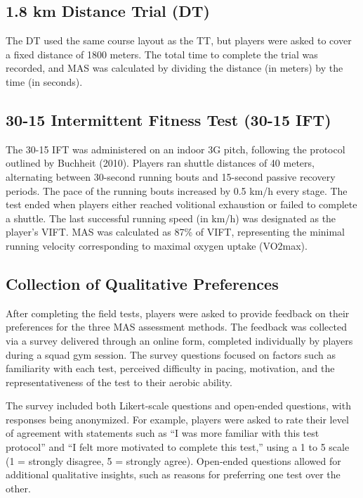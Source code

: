 \documentclass[
  man]{apa6}
\begin{document}
\subsection{1.8 km Distance Trial (DT)}\label{km-distance-trial-dt}

The DT used the same course layout as the TT, but players were asked to cover a fixed distance of 1800 meters. The total time to complete the trial was recorded, and MAS was calculated by dividing the distance (in meters) by the time (in seconds).

\subsection{30-15 Intermittent Fitness Test (30-15 IFT)}\label{intermittent-fitness-test-30-15-ift}

The 30-15 IFT was administered on an indoor 3G pitch, following the protocol outlined by Buchheit (2010). Players ran shuttle distances of 40 meters, alternating between 30-second running bouts and 15-second passive recovery periods. The pace of the running bouts increased by 0.5 km/h every stage. The test ended when players either reached volitional exhaustion or failed to complete a shuttle. The last successful running speed (in km/h) was designated as the player's VIFT. MAS was calculated as 87\% of VIFT, representing the minimal running velocity corresponding to maximal oxygen uptake (VO2max).

\subsection{Collection of Qualitative Preferences}\label{collection-of-qualitative-preferences}

After completing the field tests, players were asked to provide feedback on their preferences for the three MAS assessment methods. The feedback was collected via a survey delivered through an online form, completed individually by players during a squad gym session. The survey questions focused on factors such as familiarity with each test, perceived difficulty in pacing, motivation, and the representativeness of the test to their aerobic ability.

The survey included both Likert-scale questions and open-ended questions, with responses being anonymized. For example, players were asked to rate their level of agreement with statements such as ``I was more familiar with this test protocol'' and ``I felt more motivated to complete this test,'' using a 1 to 5 scale (1 = strongly disagree, 5 = strongly agree). Open-ended questions allowed for additional qualitative insights, such as reasons for preferring one test over the other.
\end{document}
